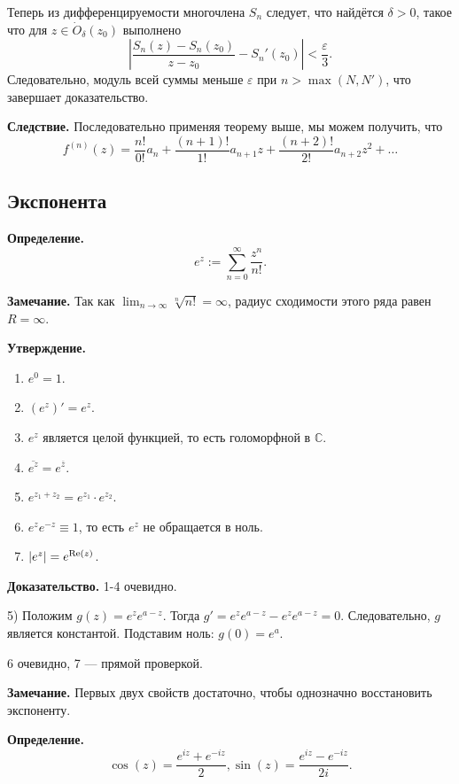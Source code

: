 \begin{enumerate}
        Теперь из дифференцируемости многочлена $S_n$ следует, что найдётся $\delta > 0$, такое что для $z \in \dot O_\delta(z_0)$ выполнено
        \[
            \left|\frac{S_n(z) - S_n(z_0)}{z - z_0} - S_n'(z_0) \right| < \frac{\varepsilon}{3}.
        \]
        Следовательно, модуль всей суммы меньше $\varepsilon$ при $n > \max(N, N')$, что завершает доказательство.
\end{enumerate}

\QED

\textbf{Следствие.} Последовательно применяя теорему выше, мы можем получить, что 
\[
    f^{(n)}(z) = \frac{n!}{0!} a_n + \frac{(n + 1)!}{1!} a_{n+1} z + \frac{(n + 2)!}{2!} a_{n+2} z^2 + \dots
\]

\subsection{Экспонента}
\textbf{Определение.}
\[
    e^z := \sum_{n=0}^{\infty} \frac{z^n}{n!}.
\]

\textbf{Замечание.} Так как $\lim_{n \to \infty} \sqrt[n]{n!} = \infty$, радиус сходимости этого ряда равен $R = \infty$.

\textbf{Утверждение.}
\begin{enumerate}
    \item $e^0 = 1$.
    \item $(e^z)' = e^z$.
    \item $e^z$ является целой функцией, то есть голоморфной в $\mathbb C$.
    \item $\overline{e^z} = e^{\overline z}$.
    \item $e^{z_1 + z_2} = e^{z_1} \cdot e^{z_2}$.
    \item $e^z e^{-z} \equiv 1$, то есть $e^z$ не обращается в ноль.
    \item $|e^z| = e^{\operatorname{Re}(z)}$.
\end{enumerate}

\textbf{Доказательство.} 1-4 очевидно.

5)
Положим $g(z) = e^z e^{a - z}$.
Тогда $g' = e^z e^{a - z} - e^z e^{a - z} = 0$.
Следовательно, $g$ является константой.
Подставим ноль: $g(0) = e^a$.

6 очевидно, 7 --- прямой проверкой.

\QED

\textbf{Замечание.} Первых двух свойств достаточно, чтобы однозначно восстановить экспоненту.

\textbf{Определение.}
\[
    \cos(z) = \frac{e^{iz} + e^{-iz}}{2}, \sin(z) = \frac{e^{iz} - e^{-iz}}{2i}.
\]

